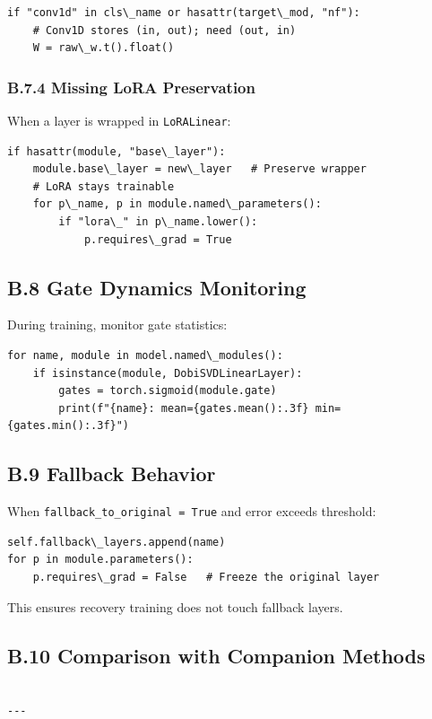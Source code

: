 \begin{lstlisting}
if "conv1d" in cls\_name or hasattr(target\_mod, "nf"):
    # Conv1D stores (in, out); need (out, in)
    W = raw\_w.t().float()
\end{lstlisting}

\subsubsection{B.7.4 Missing LoRA Preservation}

When a layer is wrapped in \texttt{LoRALinear}:

\begin{lstlisting}
if hasattr(module, "base\_layer"):
    module.base\_layer = new\_layer   # Preserve wrapper
    # LoRA stays trainable
    for p\_name, p in module.named\_parameters():
        if "lora\_" in p\_name.lower():
            p.requires\_grad = True
\end{lstlisting}

\subsection{B.8 Gate Dynamics Monitoring}

During training, monitor gate statistics:

\begin{lstlisting}
for name, module in model.named\_modules():
    if isinstance(module, DobiSVDLinearLayer):
        gates = torch.sigmoid(module.gate)
        print(f"{name}: mean={gates.mean():.3f} min={gates.min():.3f}")
\end{lstlisting}

\subsection{B.9 Fallback Behavior}

When \texttt{fallback\_to\_original = True} and error exceeds threshold:

\begin{lstlisting}
self.fallback\_layers.append(name)
for p in module.parameters():
    p.requires\_grad = False   # Freeze the original layer
\end{lstlisting}

This ensures recovery training does not touch fallback layers.

\subsection{B.10 Comparison with Companion Methods}

\begin{lstlisting}

---
\end{lstlisting}